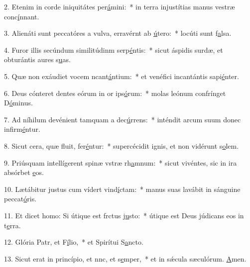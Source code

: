 2. Etenim in corde iniquitátes per\uline{á}mini:~* in terra injustítias manus vestræ conc\uline{í}nnant.\par 
3. Alienáti sunt peccatóres a vulva, erravérnt ab \uline{ú}tero:~* locúti sunt f\uline{a}lsa.\par 
4. Furor illis secúndum similitúdinm serp\uline{é}ntis:~* sicut áspidis surdæ, et obturántis aures s\uline{u}as.\par 
5. Quæ non exáudiet vocem ncant\uline{á}ntium:~* et venéfici incantántis sapi\uline{é}nter.\par 
6. Deus cónteret dentes eórum in or ips\uline{ó}rum:~* molas leónum confrínget D\uline{ó}minus.\par 
7. Ad níhilum devénient tamquam a dec\uline{ú}rrens:~* inténdit arcum suum donec infirm\uline{é}ntur.\par 
8. Sicut cera, quæ fluit, fer\uline{é}ntur:~* supercécidit ignis, et non vidérunt s\uline{o}lem.\par 
9. Priúsquam intellígerent spinæ vstræ rh\uline{a}mnum:~* sicut vivéntes, sic in ira absórbet \uline{e}os.\par 
10. Lætábitur justus cum vídert vind\uline{í}ctam:~* manus suas lavábit in sánguine peccat\uline{ó}ris.\par 
11. Et dicet homo: Si útique est frctus j\uline{u}sto:~* útique est Deus júdicans eos in t\uline{e}rra.\par 
12. Glória Patr, et F\uline{í}lio,~* et Spirítui S\uline{a}ncto.\par 
13. Sicut erat in princípio, et nnc, et s\uline{e}mper,~* et in sǽcula sæculórum. \uline{A}men.\par 
